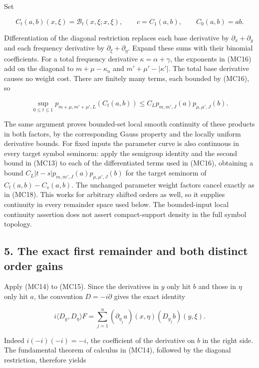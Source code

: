 \documentclass[
  11pt,
]{article}
\begin{document}
Set

\[
C_t(a,b)(x,\xi)=\mathcal B_t(x,\xi;x,\xi),\qquad
c=C_1(a,b),\qquad C_0(a,b)=ab.
\tag{MC17}
\]

Differentiation of the diagonal restriction replaces each base
derivative by \(\partial_x+\partial_y\) and each frequency derivative by
\(\partial_\xi+\partial_\eta\). Expand these sums with their binomial
coefficients. For a total frequency derivative \(\kappa=\alpha+\gamma\),
the exponents in (MC16) add on the diagonal to \(m+\mu-\kappa_n\) and
\(m'+\mu'-|\kappa'|\). The total base derivative causes no weight cost.
There are finitely many terms, each bounded by (MC16), so

\[
\sup_{0\leq t\leq1}p_{m+\mu,m'+\mu',L}(C_t(a,b))
\leq C_Lp_{m,m',J}(a)p_{\mu,\mu',J}(b).
\tag{MC18}
\]

The same argument proves bounded-set local smooth continuity of these
products in both factors, by the corresponding Gauss property and the
locally uniform derivative bounds. For fixed inputs the parameter curve
is also continuous in every target symbol seminorm: apply the semigroup
identity and the second bound in (MC13) to each of the differentiated
terms used in (MC16), obtaining a bound
\(C_L|t-s|p_{m,m',J}(a)p_{\mu,\mu',J}(b)\) for the target seminorm of
\(C_t(a,b)-C_s(a,b)\). The unchanged parameter weight factors cancel
exactly as in (MC18). This works for arbitrary shifted orders as well,
so it supplies continuity in every remainder space used below. The
bounded-input local continuity assertion does not assert compact-support
density in the full symbol topology.

\subsection{5. The exact first remainder and both distinct order
gains}\label{the-exact-first-remainder-and-both-distinct-order-gains}

Apply (MC14) to (MC15). Since the derivatives in \(y\) only hit \(b\)
and those in \(\eta\) only hit \(a\), the convention \(D=-i\partial\)
gives the exact identity

\[
i\langle D_y,D_\eta\rangle F
=\sum_{j=1}^n(\partial_{\eta_j}a)(x,\eta)
                 (D_{y_j}b)(y,\xi).
\tag{MC19}
\]

Indeed \(i(-i)(-i)=-i\), the coefficient of the derivative on \(b\) in
the right side. The fundamental theorem of calculus in (MC14), followed
by the diagonal restriction, therefore yields
\end{document}
